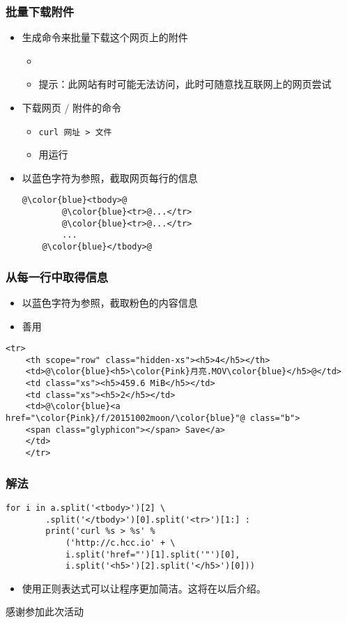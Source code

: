\begin{CJK}{UTF8}{gbsn}
\begin{frame} [fragile]
	\frametitle{批量下载附件}
	\begin{itemize}
	\item 生成命令来批量下载这个网页上的附件
		\begin{itemize}
		\item {}
		\item 提示：此网站有时可能无法访问，此时可随意找互联网上的网页尝试
		\end{itemize}
	\item 下载网页 / 附件的命令
		\begin{itemize}
		\item \texttt{curl 网址 > 文件}
		\item 用运行
		\end{itemize}
	\item 以{\color{blue}蓝色}字符为参照，截取网页每行的信息
	\begin{lstlisting}[style=pythonstyle, gobble=4, texcl, escapechar=@]
	@\color{blue}<tbody>@
		@\color{blue}<tr>@...</tr>
		@\color{blue}<tr>@...</tr>
		...
	@\color{blue}</tbody>@
	\end{lstlisting}
	\end{itemize}
\end{frame}

\begin{frame} [fragile]
	\frametitle{从每一行中取得信息}
	\begin{itemize}
	\item 以{\color{blue}蓝色}字符为参照，截取{\color{Pink}粉色}的内容信息
	\item 善用 
	\end{itemize}
	\begin{lstlisting}[basicstyle=\ttfamily, gobble=4, texcl, escapechar=@]
	<tr>
	<th scope="row" class="hidden-xs"><h5>4</h5></th>
	<td>@\color{blue}<h5>\color{Pink}月亮.MOV\color{blue}</h5>@</td>
	<td class="xs"><h5>459.6 MiB</h5></td>
	<td class="xs"><h5>2</h5></td>
	<td>@\color{blue}<a href="\color{Pink}/f/20151002moon/\color{blue}"@ class="b">
	<span class="glyphicon"></span> Save</a>
	</td>
	</tr>
	\end{lstlisting}
\end{frame}

\begin{frame} [fragile]
	\frametitle{解法}
	\begin{lstlisting}[style=pythonstyle, gobble=4, texcl, escapechar=@]
	for i in a.split('<tbody>')[2] \
		.split('</tbody>')[0].split('<tr>')[1:] : 
		print('curl %s > %s' % 
			('http://c.hcc.io' + \
			i.split('href="')[1].split('"')[0], 
			i.split('<h5>')[2].split('</h5>')[0]))
	\end{lstlisting}
	\begin{itemize}
	\item 使用正则表达式可以让程序更加简洁。这将在以后介绍。
	\end{itemize}
\end{frame}

\PreLastFrame
\begin{frame}
	\centerline{\fontsize{32}{32}\selectfont 感谢参加此次活动}
\end{frame}

\newpage
\end{CJK}


